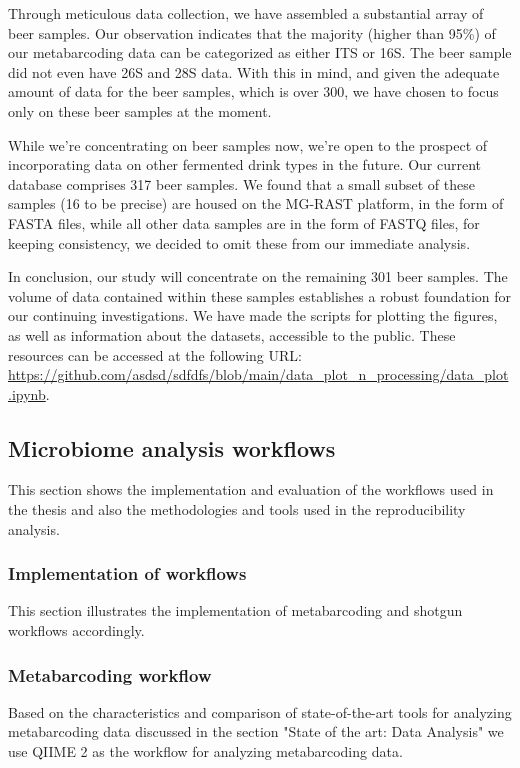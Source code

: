         Through meticulous data collection, we have assembled a substantial array of beer samples. Our observation indicates that the majority (higher than 95\%) of our metabarcoding data  can be categorized as either ITS or 16S.  The beer sample did not even have 26S and 28S data. With this in mind, and given the adequate amount of data for the beer samples, which is over 300, we have chosen to focus only on these beer samples at the moment.

        While we're concentrating on beer samples now, we're open to the prospect of incorporating data on other fermented drink types in the future. Our current database comprises 317 beer samples. We found that a small subset of these samples (16 to be precise) are housed on the MG-RAST platform, in the form of FASTA files, while all other data samples are in the form of FASTQ files, for keeping consistency, we decided to omit these from our immediate analysis.
        
        In conclusion, our study will concentrate on the remaining 301 beer samples. The volume of data contained within these samples establishes a robust foundation for our continuing investigations. We have made the scripts for plotting the figures, as well as information about the datasets, accessible to the public. These resources can be accessed at the following URL: \url{https://github.com/asdsd/sdfdfs/blob/main/data_plot_n_processing/data_plot.ipynb}.

    
    \subsection{Microbiome analysis workflows}

        This section shows the implementation and evaluation of the workflows used in the thesis and also the methodologies and tools used in the reproducibility analysis.
        
        \subsubsection{Implementation of workflows}

        This section illustrates the implementation of metabarcoding and shotgun workflows accordingly.
        
        \subsubsection*{Metabarcoding workflow}
            Based on the characteristics and comparison of state-of-the-art tools for analyzing metabarcoding data discussed in the section "State of the art: Data Analysis" we use QIIME 2 as the workflow for analyzing metabarcoding data.

